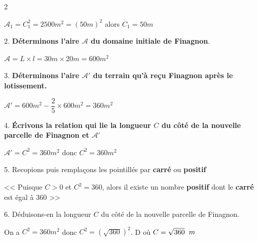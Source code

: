 \begin{multicols*}{2}
  	
  	$\mathcal{A}_{1}=C_{1}^{2}=2500 m^{2}=(50m)^{2} $ alors $C_{1}=50 m$
  	
  	2.\textbf{ Déterminons l'aire $\mathcal{A}$ du domaine initiale de Finagnon}.
  	
  	$\mathcal{A} = L\times l= 30 m \times 20 m= 600 m^{2}$
  	
  	3.  \textbf{Déterminons l'aire $\mathcal{A'}$ du terrain qu'à reçu  Finagnon après le lotissement.}
  	
  	$\mathcal{A'}= 600 m^{2}-\dfrac{2}{5}\times  600 m^{2}=360 m^{2}$
  	
  	4.\textbf{ Écrivons la relation qui lie la longueur $C$ du côté de la nouvelle parcelle de Finagnon et $\mathcal{A'}$} 
  	
  	$\mathcal{A'}= C^{2}=360 m^{2}$	donc $C^{2}=360 m^{2}$
  	
  	5.  Recopions puis remplaçons les pointillés par \textbf{carré} ou \textbf{positif}
  	
  	<< Puisque $C>0$ et $C^2=360 $, alors il existe un nombre \textbf{positif} dont le \textbf{carré} est égal à 360 >>
  	
  	6. Déduisons-en la longueur $C$ du côté de la nouvelle parcelle de Finagnon.
  	
  	On a $C^{2}=360 m^{2}$ donc  $C^{2}=\left(\sqrt{360}\right)^2$. D où $C=\sqrt{360}\hspace{0.2cm} m$	
\end{multicols*}

